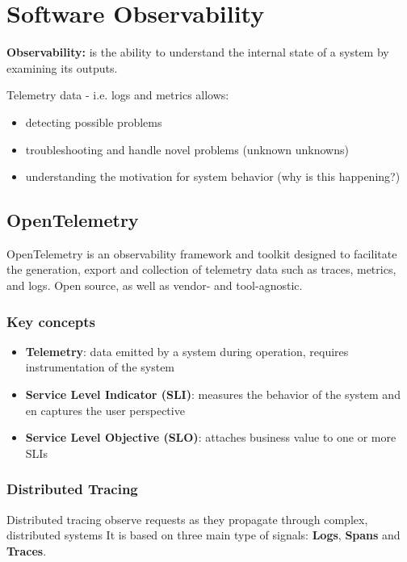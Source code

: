 \chapter{Software Observability}

\begin{tcolorbox}
  \textbf{Observability:} is the ability to
  understand the internal state of
  a system by examining its outputs.
\end{tcolorbox}

Telemetry data - i.e. logs and metrics allows:

\begin{itemize}
  \item detecting possible problems
  \item troubleshooting and handle novel problems (unknown unknowns)
  \item understanding the motivation for system behavior (why is this happening?)
\end{itemize}

\section{OpenTelemetry}

OpenTelemetry is an observability framework and toolkit designed to facilitate
the generation, export and collection of telemetry data such as traces, metrics,
and logs. Open source, as well as vendor- and tool-agnostic.

\subsection{Key concepts}

\begin{itemize}
  \item \textbf{Telemetry}: data emitted by a system during operation, requires instrumentation of the system
  \item \textbf{Service Level Indicator (SLI)}: measures the behavior of the system and en captures the user perspective
  \item \textbf{Service Level Objective (SLO)}: attaches business value to one or more SLIs
\end{itemize}

\subsection{Distributed Tracing}

Distributed tracing observe requests as they propagate
through complex, distributed systems
It is based on three main type of signals: \textbf{Logs}, \textbf{Spans} and \textbf{Traces}.


